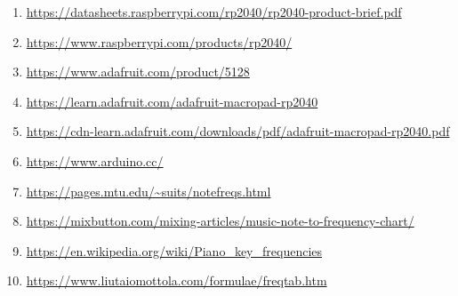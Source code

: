 \documentclass{article}
\begin{document}
\begin{enumerate}
\item \url{https://datasheets.raspberrypi.com/rp2040/rp2040-product-brief.pdf}\\
\item \url{https://www.raspberrypi.com/products/rp2040/} \\
\item \url{https://www.adafruit.com/product/5128} \\
\item \url{https://learn.adafruit.com/adafruit-macropad-rp2040} \\
\item \url{https://cdn-learn.adafruit.com/downloads/pdf/adafruit-macropad-rp2040.pdf} \\
\item \url{https://www.arduino.cc/} \\ 
\item \url{https://pages.mtu.edu/~suits/notefreqs.html} \\
\item \url{https://mixbutton.com/mixing-articles/music-note-to-frequency-chart/} \\
\item \url{https://en.wikipedia.org/wiki/Piano_key_frequencies} \\
\item \url{https://www.liutaiomottola.com/formulae/freqtab.htm} \\
\end{enumerate}

\end{document}
